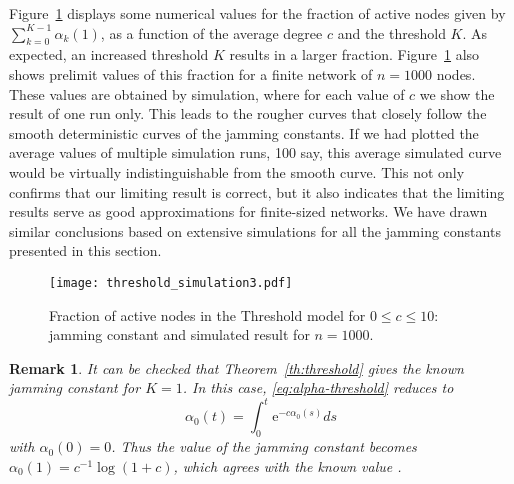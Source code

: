\documentclass[11pt,a4paper, reqno]{article}
\newtheorem{remark}{Remark}
\begin{document}
Figure~\ref{fig-th} displays some numerical values for the fraction of active nodes given by $ \sum_{k=0}^{K-1}\alpha_k(1)$, as a function of 
the average degree $c$ and the threshold $K$. As expected, an increased threshold $K$ results in a larger fraction.
Figure~\ref{fig-th} also shows prelimit values of this fraction for a finite network of $n=1000$ nodes. These values are obtained by simulation, where for each value of $c$ we show the result of one run only.
 This leads to the rougher curves that  closely follow the smooth deterministic curves of the jamming constants. If we had plotted the average values of multiple simulation runs, 100 say, this average simulated curve would be virtually indistinguishable from the smooth curve. This not only confirms that our limiting result is correct, but it also indicates that the limiting results serve as good approximations for finite-sized networks.  We have drawn similar conclusions based on extensive simulations for all the jamming constants presented in this section. 

\begin{figure}
\begin{center}
\texttt{[image: threshold\_simulation3.pdf]}
\end{center}
\caption{Fraction of active nodes in the Threshold model for $0\leq c\leq 10$: jamming constant and simulated result for $n=1000$.}
\label{fig-th}
\end{figure}

\begin{remark}\label{rem:K=1}
\normalfont
It can be checked that Theorem~\ref{th:threshold} gives the known jamming constant for $K=1$. In this case, \eqref{eq:alpha-threshold} reduces to 
 \begin{equation}
 \alpha_0(t)=\int_0^t{\ensuremath{\mathrm{e}}}^{-c\alpha_0(s)}ds
 \end{equation}
 with $\alpha_0(0)=0$. Thus the value of the jamming constant becomes $\alpha_0(1)=c^{-1}\log(1+c)$, which agrees with the known value \cite[Theorem 2.2 (ii)]{M84}.
\end{remark}
\end{document}
